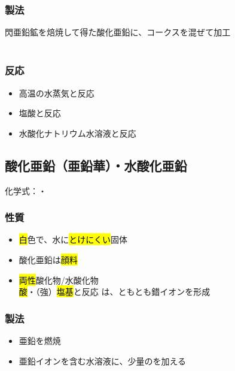 \subsubsection{製法}
閃亜鉛鉱を焙焼して得た酸化亜鉛に、コークスを混ぜて加工 \K\\
\\
\subsubsection{反応}
\begin{itemize}
    \item 高温の水蒸気と反応 \\
    \item 塩酸と反応 \\
    \item 水酸化ナトリウム水溶液と反応 \\
\end{itemize}
\subsection{酸化亜鉛（亜鉛華）・水酸化亜鉛}
化学式：\hl{}・\hl{}
\subsubsection{性質}
\begin{itemize}
    \item \hl{白}色で、水に\hl{とけにくい}固体
    \item 酸化亜鉛は\hl{顔料}
    \item \hl{両性}酸化物/水酸化物\\
          \hl{酸}・（強）\hl{塩基}と反応
          は、\hl{}とも\hl{}とも錯イオンを形成
\end{itemize}
\subsubsection{製法}
\begin{itemize}
    \item 亜鉛を燃焼 \K {}\\
    \item 亜鉛イオンを含む水溶液に、少量の\hl{}を加える \\
\end{itemize}
